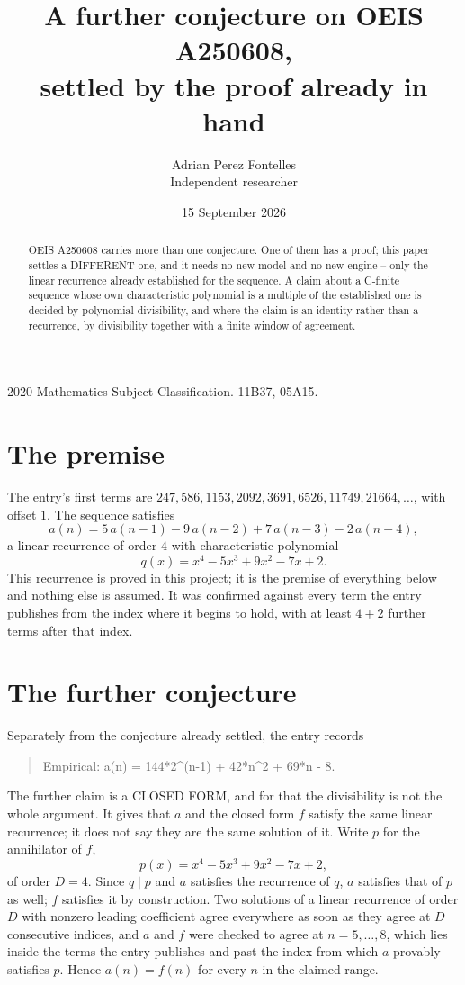 \documentclass[11pt,a4paper]{article}
\title{A further conjecture on OEIS A250608,\\ \large settled by the proof already in hand}
\author{Adrian Perez Fontelles\\ \small Independent researcher}
\date{15 September 2026}
\theoremstyle{plain}
\theoremstyle{definition}
\begin{document}
\maketitle

\begin{abstract}
OEIS A250608 carries more than one conjecture. One of them has a proof; this paper settles a
DIFFERENT one, and it needs no new model and no new engine -- only the linear recurrence already
established for the sequence. A claim about a C-finite sequence whose own characteristic
polynomial is a multiple of the established one is decided by polynomial divisibility, and where
the claim is an identity rather than a recurrence, by divisibility together with a finite window
of agreement.
\end{abstract}

\noindent\small 2020 Mathematics Subject Classification. 11B37, 05A15.\normalsize

\section{The premise}

The entry's first terms are $247, 586, 1153, 2092, 3691, 6526, 11749, 21664,\dots$, with offset $1$. The sequence satisfies
\[
  a(n)=5\,a(n-1) - 9\,a(n-2) + 7\,a(n-3) - 2\,a(n-4) ,
\]
a linear recurrence of order $4$ with characteristic polynomial
\[
  q(x)=x^{4} - 5 x^{3} + 9 x^{2} - 7 x + 2 .
\]
This recurrence is proved in this project; it is the premise of everything below and nothing else is assumed.
It was confirmed against every term the entry publishes from the index where it begins to hold,
with at least $4+2$ further terms after that index.

\section{The further conjecture}

Separately from the conjecture already settled, the entry records

\begin{quote}\raggedright Empirical: a(n) = 144*2\^{}(n-1) + 42*n\^{}2 + 69*n - 8.\end{quote}

The further claim is a CLOSED FORM, and for that the divisibility is not the whole argument. It
gives that $a$ and the closed form $f$ satisfy the same linear recurrence; it does not say they
are the same solution of it. Write $p$ for the annihilator of $f$,
\[
  p(x)=x^{4} - 5 x^{3} + 9 x^{2} - 7 x + 2 ,
\]
of order $D=4$. Since $q\mid p$ and $a$ satisfies the recurrence of $q$, $a$ satisfies that of
$p$ as well; $f$ satisfies it by construction. Two solutions of a linear recurrence of order $D$
with nonzero leading coefficient agree everywhere as soon as they agree at $D$ consecutive
indices, and $a$ and $f$ were checked to agree at $n=5,\dots,8$,
which lies inside the terms the entry publishes and past the index from which $a$ provably
satisfies $p$. Hence $a(n)=f(n)$ for every $n$ in the claimed range.
\end{document}
